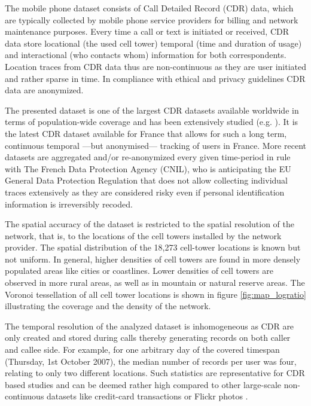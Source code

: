 \documentclass[a4paper]{article}
\begin{document}
The mobile phone dataset consists of Call Detailed Record (CDR) data, which are typically collected by mobile phone service providers for billing and network maintenance purposes. Every time a call or text is initiated or received, CDR data store locational (the used cell tower)\added{,} temporal (time and duration of usage)\added{,} and interactional (who contacts whom) information for both correspondents. Location traces from CDR data thus are non-continuous as they are user initiated and rather sparse in time. In compliance with ethical and privacy guidelines CDR data are anonymized.

The presented dataset is one of the largest CDR datasets available worldwide in terms of population-wide coverage and has been extensively studied (e.g. \cite{Sobolevsky2013_delineating,Deville2014,Grauwin2017,Janzen2018_closer,Vanhoof_JOS,vanhoof_arxiv_spatial_uncertainty}). It is the latest CDR dataset available for France that allows for such a long term, continuous temporal —but anonymised— tracking of users in France. More recent datasets are aggregated and/or re-anonymized every given time-period in rule with The French Data Protection Agency (CNIL), who is anticipating the EU General Data Protection Regulation that does not allow collecting individual traces extensively as they are considered risky even if personal identification information is irreversibly recoded.

The spatial accuracy of the dataset is restricted to the spatial resolution of the network, that is, to the locations of the cell towers installed by the network provider. The spatial distribution of the 18,273 cell-tower locations is known but not uniform. In general, higher densities of cell towers are found in more densely populated areas like cities or coastlines. Lower densities of cell towers are observed in more rural areas, as well as in mountain or natural reserve areas. The Voronoi tessellation of all cell tower locations is shown in figure \ref{fig:map_logratio} illustrating the coverage and the density of the network.

The temporal resolution of the analyzed dataset is inhomogeneous as CDR are only created and stored during calls thereby generating records on both caller and callee side. For example, for one arbitrary day of the covered timespan (Thursday, 1st October 2007), the median number of records per user was four, relating to only two different locations. Such statistics are representative for CDR based studies and can be deemed rather high compared to other large-scale non-continuous datasets like credit-card transactions or Flickr photos \cite{Bojic2015}.
\end{document}
